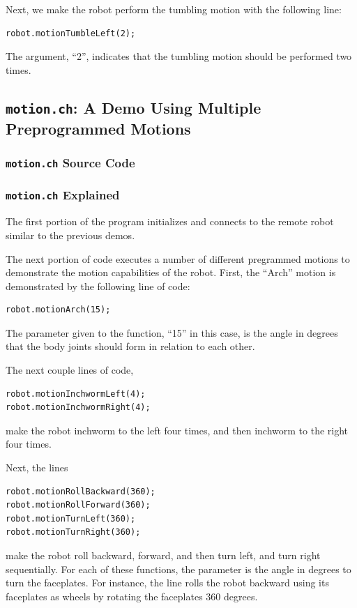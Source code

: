 \documentclass{article}
\begin{document}
Next, we make the robot perform the tumbling motion with the following line:
\begin{verbatim}
robot.motionTumbleLeft(2);
\end{verbatim}
The argument, ``2'', indicates that the tumbling motion should be performed
two times.

\subsection{\texttt{motion.ch}: A Demo Using Multiple Preprogrammed Motions}
\subsubsection{\texttt{motion.ch} Source Code}

\subsubsection{\texttt{motion.ch} Explained}
The first portion of the program initializes and connects to the
remote robot similar to the previous demos.

The next portion of code executes a number of different pregrammed motions
to demonstrate the motion capabilities of the robot. First, the ``Arch'' motion
is demonstrated by the following line of code:
\begin{verbatim}
robot.motionArch(15);
\end{verbatim}
The parameter given to the function, ``15'' in this case, is the angle in degrees 
that the body joints should form in relation to each other. 

The next couple lines of code,
\begin{verbatim}
robot.motionInchwormLeft(4);
robot.motionInchwormRight(4);
\end{verbatim}
make the robot inchworm to the left four times, and then inchworm to the right
four times. 

Next, the lines
\begin{verbatim}
robot.motionRollBackward(360);
robot.motionRollForward(360);
robot.motionTurnLeft(360);
robot.motionTurnRight(360);
\end{verbatim}
make the robot roll backward, forward, and then turn left, and turn right
sequentially. For each of these functions, the parameter is the angle in degrees
to turn the faceplates. For instance, the line rolls the robot backward
using its faceplates as wheels by rotating the faceplates 360 degrees.
\end{document}

